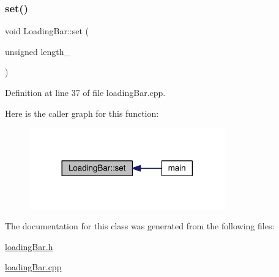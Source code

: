 \subsubsection{\texorpdfstring{set()}{set()}}
{\footnotesize\ttfamily void Loading\+Bar\+::set (\begin{DoxyParamCaption}\item[{unsigned}]{length\+\_\+ }\end{DoxyParamCaption})}



Definition at line 37 of file loading\+Bar.\+cpp.

Here is the caller graph for this function\+:\nopagebreak
\begin{figure}[H]
\begin{center}
\leavevmode
\includegraphics[width=240pt]{class_loading_bar_aa36409c317164b0e74f6feafc902fa64_icgraph}
\end{center}
\end{figure}


The documentation for this class was generated from the following files\+:\begin{DoxyCompactItemize}
\item 
\hyperlink{loading_bar_8h}{loading\+Bar.\+h}\item 
\hyperlink{loading_bar_8cpp}{loading\+Bar.\+cpp}\end{DoxyCompactItemize}
